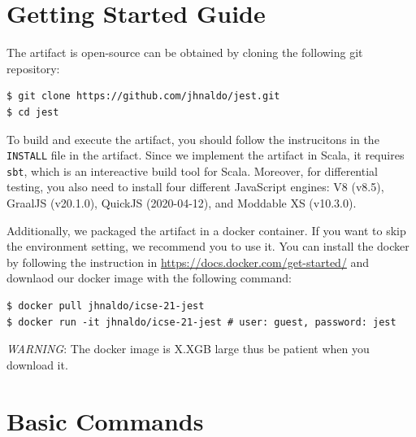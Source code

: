 \documentclass{article}
\begin{document}
\section{Getting Started Guide}

The artifact is open-source can be obtained by cloning the following git
repository:
\begin{lstlisting}
$ git clone https://github.com/jhnaldo/jest.git
$ cd jest
\end{lstlisting}
To build and execute the artifact, you should follow the instrucitons in the
\texttt{INSTALL} file in the artifact.  Since we implement the artifact in
Scala, it requires \texttt{sbt}, which is an intereactive build tool for Scala.
Moreover, for differential testing, you also need to install four different
JavaScript engines: V8 (v8.5), GraalJS (v20.1.0), QuickJS (2020-04-12), and
Moddable XS (v10.3.0).

Additionally, we packaged the artifact in a docker container.  If you want to
skip the environment setting, we recommend you to use it.  You can install the
docker by following the instruction in
\url{https://docs.docker.com/get-started/} and downlaod our docker image with
the following command:
\begin{lstlisting}
$ docker pull jhnaldo/icse-21-jest
$ docker run -it jhnaldo/icse-21-jest # user: guest, password: jest
\end{lstlisting}
\textit{WARNING}: The docker image is X.XGB large thus be patient when you
download it.


\section{Basic Commands}
\end{document}
